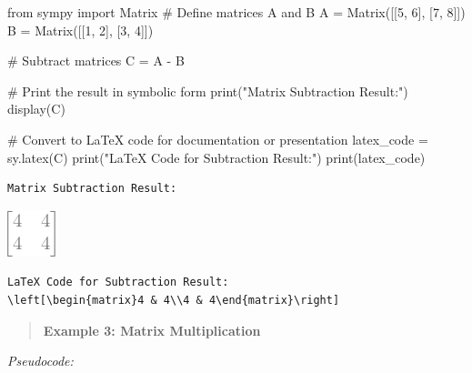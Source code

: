\documentclass[
  letterpaper,
  DIV=11,
  numbers=noendperiod]{scrreprt}
\newenvironment{Shaded}{\begin{snugshade}}{\end{snugshade}}
\newcommand{\BuiltInTok}[1]{\textcolor[rgb]{0.00,0.23,0.31}{#1}}
\newcommand{\CommentTok}[1]{\textcolor[rgb]{0.37,0.37,0.37}{#1}}
\newcommand{\DecValTok}[1]{\textcolor[rgb]{0.68,0.00,0.00}{#1}}
\newcommand{\ImportTok}[1]{\textcolor[rgb]{0.00,0.46,0.62}{#1}}
\newcommand{\NormalTok}[1]{\textcolor[rgb]{0.00,0.23,0.31}{#1}}
\newcommand{\OperatorTok}[1]{\textcolor[rgb]{0.37,0.37,0.37}{#1}}
\newcommand{\StringTok}[1]{\textcolor[rgb]{0.13,0.47,0.30}{#1}}
\theoremstyle{plain}
\theoremstyle{definition}
\theoremstyle{remark}
\begin{document}
\begin{Shaded}
\begin{Highlighting}[]
\ImportTok{from}\NormalTok{ sympy }\ImportTok{import}\NormalTok{ Matrix}
\CommentTok{\# Define matrices A and B}
\NormalTok{A }\OperatorTok{=}\NormalTok{ Matrix([[}\DecValTok{5}\NormalTok{, }\DecValTok{6}\NormalTok{], [}\DecValTok{7}\NormalTok{, }\DecValTok{8}\NormalTok{]])}
\NormalTok{B }\OperatorTok{=}\NormalTok{ Matrix([[}\DecValTok{1}\NormalTok{, }\DecValTok{2}\NormalTok{], [}\DecValTok{3}\NormalTok{, }\DecValTok{4}\NormalTok{]])}

\CommentTok{\# Subtract matrices}
\NormalTok{C }\OperatorTok{=}\NormalTok{ A }\OperatorTok{{-}}\NormalTok{ B}

\CommentTok{\# Print the result in symbolic form}
\BuiltInTok{print}\NormalTok{(}\StringTok{"Matrix Subtraction Result:"}\NormalTok{)}
\NormalTok{display(C)}

\CommentTok{\# Convert to LaTeX code for documentation or presentation}
\NormalTok{latex\_code }\OperatorTok{=}\NormalTok{ sy.latex(C)}
\BuiltInTok{print}\NormalTok{(}\StringTok{"LaTeX Code for Subtraction Result:"}\NormalTok{)}
\BuiltInTok{print}\NormalTok{(latex\_code)}
\end{Highlighting}
\end{Shaded}

\begin{verbatim}
Matrix Subtraction Result:
\end{verbatim}

\includegraphics{module_1_files/figure-pdf/cell-4-output-2.png}

\begin{verbatim}
LaTeX Code for Subtraction Result:
\left[\begin{matrix}4 & 4\\4 & 4\end{matrix}\right]
\end{verbatim}

\begin{quote}
\textbf{Example 3: Matrix Multiplication}
\end{quote}

\emph{Pseudocode:}
\end{document}
